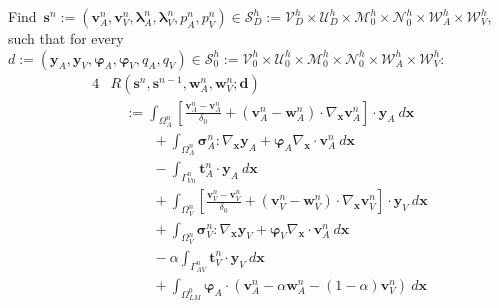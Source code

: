 \documentclass[3p]{elsarticle}
\begin{document}
Find~$\boldsymbol{s}^n
:= ( \boldsymbol{v}_A^n, \boldsymbol{v}_V^n,
\boldsymbol{\lambda}_A^n, \boldsymbol{\lambda}_V^n,
p_A^n, p_V^n )
\in \boldsymbol{\mathcal{S}}_D^h
:= \boldsymbol{\mathcal{V}}_D^h \times \boldsymbol{\mathcal{U}}_D^h
\times \boldsymbol{\mathcal{M}}_0^h \times \boldsymbol{\mathcal{N}}_0^h
\times \mathcal{W}_A^h \times \mathcal{W}_V^h$,
such that for every~$d
:= ( \boldsymbol{y}_A, \boldsymbol{y}_V, \boldsymbol{\varphi}_A, \boldsymbol{\varphi}_V, q_A, q_V )
\in \boldsymbol{\mathcal{S}}_0^h
:= \boldsymbol{\mathcal{V}}_0^h \times \boldsymbol{\mathcal{U}}_0^h
\times \boldsymbol{\mathcal{M}}_0^h \times \boldsymbol{\mathcal{N}}_0^h
\times \mathcal{W}_A^h \times \mathcal{W}_V^h$:
\begin{alignat}{4}
    &R \left( \boldsymbol{s}^n, \boldsymbol{s}^{n-1},
        \boldsymbol{w}_A^n, \boldsymbol{w}_V^n;
        \boldsymbol{d} \right) \nonumber \\
        &\quad:= \int_{\Omega_A^n} \left[ \frac{\boldsymbol{v}_A^n - \boldsymbol{v}_A^n}{\delta_0}
        + \left( \boldsymbol{v}_A^n - \boldsymbol{w}_A^n \right) \cdot \nabla_{\boldsymbol{x}} \boldsymbol{v}_A^n \right] \cdot \boldsymbol{y}_A~d\boldsymbol{x} \nonumber \\
    &\quad\qquad + \int_{\Omega_A^n} \boldsymbol{\sigma}_A^n : \nabla_{\boldsymbol{x}} \boldsymbol{y}_A + \boldsymbol{\varphi}_A \nabla_{\boldsymbol{x}} \cdot \boldsymbol{v}_A^n~d\boldsymbol{x} \nonumber \\
    &\quad\qquad - \int_{\Gamma_{Vn}^n} \boldsymbol{t}_A^n \cdot \boldsymbol{y}_A~d\boldsymbol{x} \nonumber \\
        &\quad\qquad +\int_{\Omega_V^n} \left[ \frac{\boldsymbol{v}_V^n - \boldsymbol{v}_V^n}{\delta_0}
        + \left( \boldsymbol{v}_V^n - \boldsymbol{w}_V^n \right) \cdot \nabla_{\boldsymbol{x}} \boldsymbol{v}_V^n \right] \cdot \boldsymbol{y}_V~d\boldsymbol{x} \nonumber \\
    &\quad\qquad + \int_{\Omega_V^n} \boldsymbol{\sigma}_V^n : \nabla_{\boldsymbol{x}} \boldsymbol{y}_V + \boldsymbol{\varphi}_V \nabla_{\boldsymbol{x}} \cdot \boldsymbol{v}_A^n~d\boldsymbol{x} \nonumber \\
    &\quad\qquad - \alpha \int_{\Gamma_{AV}^n} \boldsymbol{t}_V^n \cdot \boldsymbol{y}_V~d\boldsymbol{x} \nonumber \\
        &\quad\qquad + \int_{\Omega_{LM}^0} \boldsymbol{\varphi}_A \cdot \left( \boldsymbol{v}_A^n - \alpha \boldsymbol{w}_A^n - (1 - \alpha) \boldsymbol{v}_V^n \right)~d\boldsymbol{x} \nonumber \\

\end{alignat}
\end{document}
